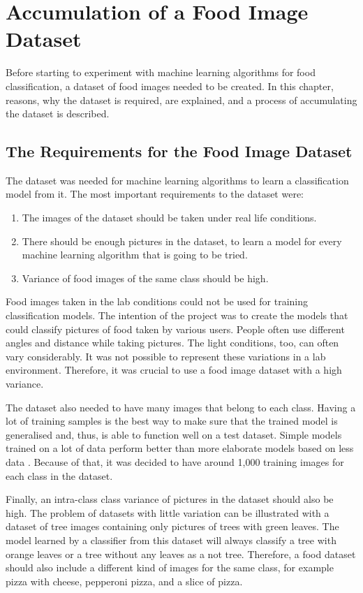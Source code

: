 \chapter{Accumulation of a Food Image Dataset}

Before starting to experiment with machine learning algorithms for food classification, a dataset of food images needed to be created. In this chapter, reasons, why the dataset is required, are  explained, and a process of accumulating the dataset is described.

\section{The Requirements for the Food Image Dataset}
 The dataset was needed for machine learning algorithms to learn a classification model from it. The most important requirements to the dataset were:

\begin{enumerate}
  \item The images of the dataset should be taken under  real life conditions.
  \item There should be enough pictures in the dataset, to learn a model for every machine learning algorithm that is going to be tried.
  \item Variance of food images of the same class should be high. 
\end{enumerate}

 
 Food images taken in the lab conditions could not be used for training classification models. The intention of the project was to create the models that could classify pictures of food taken by various users. People often use different angles and distance while taking pictures. The light conditions, too, can often vary considerably. It was not possible to represent these variations in a lab environment. Therefore, it was crucial to use a food image dataset with a high variance.

The dataset also needed to have many images that belong to each class. Having a lot of training samples is the best way to make sure that the trained model is generalised and, thus, is able to function well on a test dataset. Simple models trained on a lot of data perform better than more elaborate models based on less data \citep{unreasonable}. Because of that, it was decided to have around  1,000 training images for each class in the dataset. 

Finally, an intra-class class variance of pictures in the dataset should also be high. The problem of datasets with little variation can be illustrated with a dataset of tree images containing only pictures of trees with green leaves. The model learned by a classifier from this dataset will always classify a tree with orange leaves or a tree without any leaves as a not tree. Therefore, a food dataset should also include a different kind of images for the same class, for example pizza with cheese, pepperoni pizza, and a slice of pizza. 

